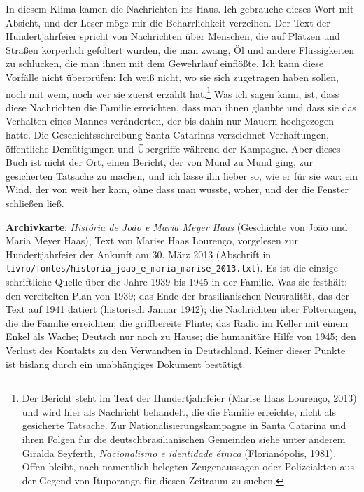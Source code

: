 \documentclass[
  ngerman,
  11pt,
  openany]{book}
\begin{document}
In diesem Klima kamen die Nachrichten ins Haus. Ich gebrauche dieses
Wort mit Absicht, und der Leser möge mir die Beharrlichkeit verzeihen.
Der Text der Hundertjahrfeier spricht von Nachrichten über Menschen, die
auf Plätzen und Straßen körperlich gefoltert wurden, die man zwang, Öl
und andere Flüssigkeiten zu schlucken, die man ihnen mit dem Gewehrlauf
einflößte. Ich kann diese Vorfälle nicht überprüfen: Ich weiß nicht, wo
sie sich zugetragen haben sollen, noch mit wem, noch wer sie zuerst
erzählt hat.\footnote{Der Bericht steht im Text der Hundertjahrfeier
  (Marise Haas Lourenço, 2013) und wird hier als Nachricht behandelt,
  die die Familie erreichte, nicht als gesicherte Tatsache. Zur
  Nationalisierungskampagne in Santa Catarina und ihren Folgen für die
  deutschbrasilianischen Gemeinden siehe unter anderem Giralda Seyferth,
  \emph{Nacionalismo e identidade étnica} (Florianópolis, 1981). Offen
  bleibt, nach namentlich belegten Zeugenaussagen oder Polizeiakten aus
  der Gegend von Ituporanga für diesen Zeitraum zu suchen.} Was ich
sagen kann, ist, dass diese Nachrichten die Familie erreichten, dass man
ihnen glaubte und dass sie das Verhalten eines Mannes veränderten, der
bis dahin nur Mauern hochgezogen hatte. Die Geschichtsschreibung Santa
Catarinas verzeichnet Verhaftungen, öffentliche Demütigungen und
Übergriffe während der Kampagne. Aber dieses Buch ist nicht der Ort,
einen Bericht, der von Mund zu Mund ging, zur gesicherten Tatsache zu
machen, und ich lasse ihn lieber so, wie er für sie war: ein Wind, der
von weit her kam, ohne dass man wusste, woher, und der die Fenster
schließen ließ.

\begin{ficha}

\textbf{Archivkarte}: \emph{História de João e Maria Meyer Haas}
(Geschichte von João und Maria Meyer Haas), Text von Marise Haas
Lourenço, vorgelesen zur Hundertjahrfeier der Ankunft am 30. März 2013
(Abschrift in
\texttt{livro/fontes/historia\_joao\_e\_maria\_marise\_2013.txt}). Es
ist die einzige schriftliche Quelle über die Jahre 1939 bis 1945 in der
Familie. Was sie festhält: den vereitelten Plan von 1939; das Ende der
brasilianischen Neutralität, das der Text auf 1941 datiert (historisch
Januar 1942); die Nachrichten über Folterungen, die die Familie
erreichten; die griffbereite Flinte; das Radio im Keller mit einem Enkel
als Wache; Deutsch nur noch zu Hause; die humanitäre Hilfe von 1945; den
Verlust des Kontakts zu den Verwandten in Deutschland. Keiner dieser
Punkte ist bislang durch ein unabhängiges Dokument bestätigt.

\end{ficha}
\end{document}
